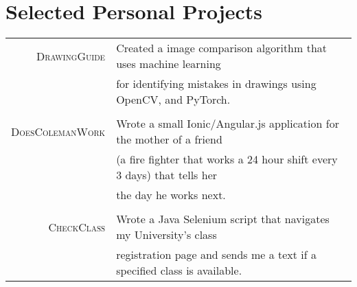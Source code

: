\documentclass[a4paper,10pt]{article}
\begin{document}
\section{Selected Personal Projects}
\begin{tabular}{rl}
 \textsc{DrawingGuide} & Created a image comparison algorithm that uses machine learning \\
 
 & 
 
for identifying mistakes in drawings using OpenCV, and PyTorch. \\

& \\
\textsc{DoesColemanWork} & Wrote a small Ionic/Angular.js application for the mother of a friend \\
& (a fire fighter that works a 24 hour shift every 3 days) that tells her \\

& the day he works next. \\

& \\
\textsc{CheckClass} & Wrote a Java Selenium script that navigates my University’s class \\
& registration page and sends me a text if a specified class is available. \\
\end{tabular}
\end{document}
